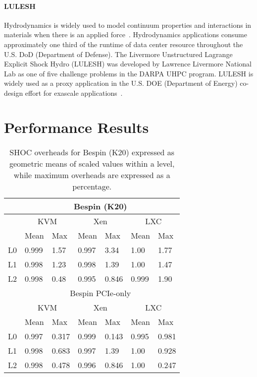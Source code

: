\paragraph{LULESH} Hydrodynamics is widely used to model continuum properties
and interactions in materials when there is an applied
force~\cite{LLNL-TR-490254}. Hydrodynamics applications consume approximately one third
of the runtime of data center resource throughout the U.S. DoD (Department of
Defense). The Livermore Unstructured Lagrange Explicit Shock Hydro (LULESH) was
developed by Lawrence Livermore National Lab as one of five challenge problems in the DARPA UHPC program.
LULESH is widely used as a proxy application in the U.S. DOE (Department of
Energy)  co-design effort for exascale applications~\cite{LULESH}. 


 

\section{Performance Results}\label{RESULTS}

\begin{table*}
\footnotesize
\caption{SHOC overheads for Bespin (K20) expressed as geometric means of scaled values within a
level, while maximum overheads are expressed as a percentage.  }
\label{K20MEANS}
\centering
    \begin{tabular}{|l|l|l|l|l|l|l|}
    \hline 
    ~  & \multicolumn{6}{c|}{Bespin (K20)} \\ \hline
    ~  & \multicolumn{2}{c|}{KVM} & \multicolumn{2}{c|}{Xen} & \multicolumn{2}{c|}{LXC} \\ \hline 
    ~  & Mean   & Max & Mean & Max & Mean & Max  \\ \hline 
    L0 & 0.999   & 1.57   & 0.997 & 3.34   & 1.00   & 1.77    \\ \hline 
    L1 & 0.998   & 1.23   & 0.998 & 1.39   & 1.00   & 1.47    \\ \hline 
    L2 & 0.998   & 0.48   & 0.995 & 0.846  & 0.999  & 1.90   \\ \hline
    ~  & \multicolumn{6}{c|}{Bespin PCIe-only}  \\ \hline
    ~  & \multicolumn{2}{c|}{KVM} & \multicolumn{2}{c|}{Xen} & \multicolumn{2}{c|}{LXC}   \\ \hline 
    ~  & Mean   & Max & Mean & Max & Mean & Max  \\ \hline 
    L0 & 0.997   & 0.317   & 0.999  & 0.143 & 0.995  & 0.981     \\ \hline 
    L1 & 0.998   & 0.683   & 0.997  & 1.39  & 1.00   & 0.928     \\ \hline 
    L2 & 0.998   & 0.478   & 0.996  & 0.846 & 1.00   & 0.247     \\ \hline
    \end{tabular}
\end{table*}

